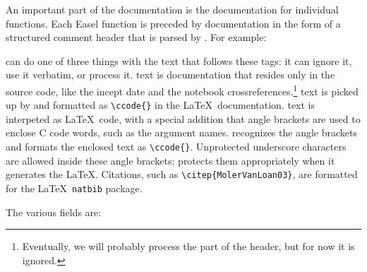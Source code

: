 An important part of the documentation is the documentation for
individual functions.  Each Easel function is preceded by
documentation in the form of a structured comment header that is
parsed by . For example:



 can do one of three things with the text that follows
these tags: it can ignore it, use it verbatim, or process
it.  text is documentation that resides only in the
source code, like the incept date and the notebook
crossreferences.\footnote{Eventually, we will probably process the
 part of the header, but for now it is ignored.}
 text is picked up by  and formatted as
\verb+\ccode{}+ in the \LaTeX\ documentation.  text
is interpeted as \LaTeX\ code, with a special addition that angle
brackets are used to enclose C code words, such as the argument names.
 recognizes the angle brackets and formats the enclosed
text as \verb+\ccode{}+.  Unprotected underscore characters are
allowed inside these angle brackets;  protects them
appropriately when it generates the \LaTeX. Citations, such as
\verb+\citep{MolerVanLoan03}+, are formatted for the \LaTeX\
\verb+natbib+ package.

The various fields are:

